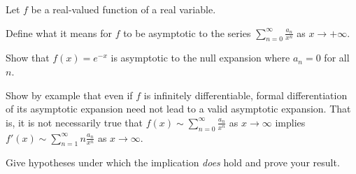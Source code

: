 Let $f$ be a real-valued function of a real variable.
\begin{alist}
\item Define what it means for $f$ to be asymptotic to the series
$\sum_{n=0}^{\infty}\frac{a_n}{x^n}$ as $x\rightarrow +\infty$.
\item Show that $f(x)=e^{-x}$ is asymptotic to the null expansion
where $a_n=0$ for all $n$.
\item Show by example that even if $f$ is infinitely differentiable,
formal differentiation of its asymptotic expansion need not lead to a
valid asymptotic expansion. That is, it is not necessarily true that
$f(x)\sim \sum_{n=0}^{\infty}\frac{a_n}{x^n}$ as $x\rightarrow \infty$
implies $f'(x)\sim \sum_{n=1}^{\infty}n\frac{a_n}{x^n}$ as
$x\rightarrow \infty$.
\item Give hypotheses under which the implication \emph{does} hold and
prove your result.
\end{alist}
